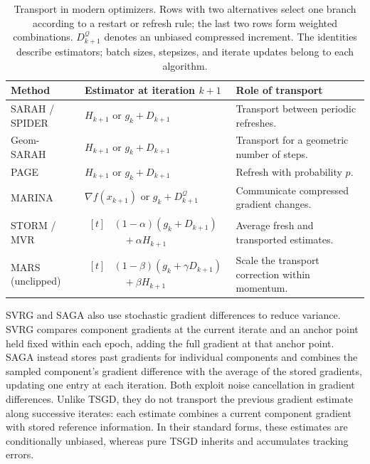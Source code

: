 \begin{table}[htbp]
\centering
\small
\setlength{\tabcolsep}{4pt}
\renewcommand{\arraystretch}{1.3}
\begin{tabular}{@{}>{\raggedright\arraybackslash}p{}
                  >{\raggedright\arraybackslash}p{}
                  >{\raggedright\arraybackslash}p{}@{}}
\toprule
Method & Estimator at iteration $k+1$ & Role of transport \\
\midrule
SARAH / SPIDER
& $H_{k+1}$ or $g_k+D_{k+1}$
& Transport between periodic refreshes. \\
\addlinespace[3pt]
Geom-SARAH
& $H_{k+1}$ or $g_k+D_{k+1}$
& Transport for a geometric number of steps. \\
\addlinespace[3pt]
PAGE
& $H_{k+1}$ or $g_k+D_{k+1}$
& Refresh with probability $p$. \\
\addlinespace[3pt]
MARINA
& $\nabla f(x_{k+1})$ or $g_k+D_{k+1}^{\mathcal Q}$
& Communicate compressed gradient changes. \\
\addlinespace[3pt]
STORM / MVR
& $\begin{aligned}[t]
   &(1-\alpha)(g_k+D_{k+1})\\
   &\quad+\alpha H_{k+1}
   \end{aligned}$
& Average fresh and transported estimates. \\
\addlinespace[3pt]
MARS (unclipped)
& $\begin{aligned}[t]
   &(1-\beta)(g_k+\gamma D_{k+1})\\
   &\quad+\beta H_{k+1}
   \end{aligned}$
& Scale the transport correction within momentum. \\
\bottomrule
\end{tabular}
\caption{Transport in modern optimizers. Rows with two alternatives
select one branch according to a restart or refresh rule; the last two
rows form weighted combinations. $D_{k+1}^{\mathcal Q}$ denotes an
unbiased compressed increment. The identities describe estimators;
batch sizes, stepsizes, and iterate updates belong to each algorithm.}
\label{tab:transport-building-blocks}
\end{table}

SVRG \citep{NIPS2013_ac1dd209} and SAGA
\citep{defazio2014sagafastincrementalgradient} also use stochastic
gradient differences to reduce variance. SVRG compares component
gradients at the current iterate and an anchor point held fixed
within each epoch, adding the full gradient at that anchor point.
SAGA instead stores past gradients for individual components and
combines the sampled component's gradient difference with the average
of the stored gradients, updating one entry at each iteration.
Both exploit noise cancellation in gradient differences. Unlike TSGD,
they do not transport the previous gradient estimate along successive
iterates: each estimate combines a current component gradient with
stored reference information. In their standard forms, these estimates
are conditionally unbiased, whereas pure TSGD inherits and accumulates
tracking errors.

